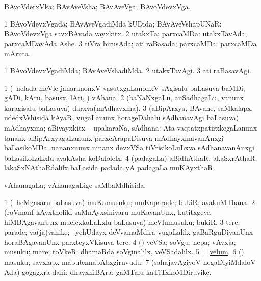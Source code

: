 \bentry
{} 
\gl{\nA}
\expl{}
\bmng
 BAvoVderxVka; BAvAveVsha; BAvAveVga; BAvoVdevxVga. 
\emng
\eentry

\bentry
{} 
\gl{\gu}
\expl{}
\bmng
\bnum
\num{1} BAvoVdevxVgada; BAvAveVgadiMda kUDida; BAvAveVshapUNaR:  BAvoVdevxVga savxBAvada vayxkitx. 
\num{2} utakxTa; parxcaMDa:  utakxTavAda, parxcaMDavAda Ashe. 
\num{3} tiVra birusAda; ati raBasada; parxcaMDa:  parxcaMDa mAruta. 
\enum
\emng
\eentry

\bentry
{} 
\gl{\kirxvi}
\expl{}
\bmng
\bnum
\num{1} BAvoVdevxVgadiMda; BAvAveVshadiMda. 
\num{2} utakxTavAgi. 
\num{3} ati raBasavAgi. 
\enum
\emng
\eentry

\bentry
{} 
\gl{\nA}
\expl{}
\bmng
\bnum
\num{1} (\kanmu\ nelada meVle janaranonxV vasutxgaLanonxV sAgisalu baLasuva baMDi, gADi, kAru, basusx, lAri, \mo) vAhana. 
\num{2} (baNaNxgaLu, auSadhagaLu, \mo vanunx karagisalu baLasuva) darxva(mAdhayxma). 
\num{3} (aBipArxya, BAvane, saMkalapx, udedxVshisida kAyaR, \mo vugaLanunx horageDahalu sAdhanavAgi baLasuva) mAdhayxma; aBivayxkitx -- upakaraNa, sAdhana:  Ata vaqtatxpatirxkegaLanunx tananx aBipArxyagaLanunx parxcArapaDisuva mAdhayxmavanAnxgi baLasikoMDa.  nananxnunx ninanx devxVSa tiVrisikoLuLxva sAdhanavanAnxgi baLasikoLaLxlu avakAsha koDalolelx. 
\num{4} (padagaLa) aBidhAthaR; akaSxrAthaR; lakaSxNAthaRdalilx baLasida padada yA padagaLa muKAyxthaR. 
\enum
\emng
\eentry

\bentry
{} 
\gl{\gu}
\expl{}
\bmng
 vAhanagaLa; vAhanagaLige saMbaMdhisida. 
\emng
\eentry

\bentry
{} 
\gl{\nA}
\expl{}
\bmng
\bnum
\num{1} (\sA\ heMgasaru baLasuva) muKamusuku; muKaparade; bukiR; avakuMThana. 
\num{2} (roVmanf kAyxtholikf saMnAyxsiniyaru muKavanUnx, kutitxgeya hiMBAgavanUnx mucicxkoLaLxlu baLasuva) meVlumusuku; bukiR. 
\num{3} tere; parade; ya(ja)vanike; \kanmu\ yehUdayx deVvamaMdira \mo vugaLalilx gaBaRguDiyanUnx horaBAgavanUnx parxteyxVkisuva tere. 
\num{4} (\rUpa) veVSa; soVgu; nepa; vAyxja; musuku; mare; toVkeR:  dhamaRda soVginalilx, veVSadalilx. 
\num{5} = \hyperlink{velum}{velum}. 
\num{6} (\CA) masuku; savxlapx mabubxmabAbxgiruvudu. 
\num{7} (sahajavAgiyoV negaDiyiMdaloV Ada) gogagxra dani; dhavxniBAra; gaMTalu kaTiTxkoMDiruvike. 
\enum
\emng

